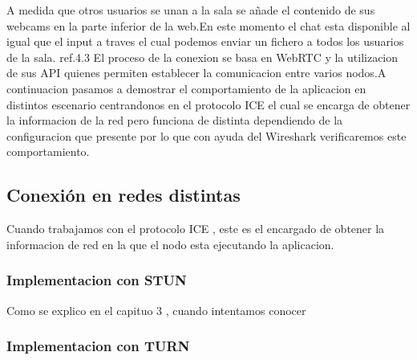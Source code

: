 A medida que otros usuarios se unan a la sala  se añade el contenido de sus webcams en la parte inferior de la web.En este momento el chat esta disponible al igual que el input a traves el cual podemos enviar un fichero a todos los usuarios de la sala. ref.4.3
El proceso de la conexion se basa en WebRTC y la utilizacion de sus API quienes permiten  establecer la comunicacion entre varios nodos.A continuacion pasamos a demostrar el comportamiento de la aplicacion en distintos escenario centrandonos en el protocolo ICE el cual se encarga de obtener la informacion de la red pero funciona de distinta dependiendo de la configuracion que presente por lo que con ayuda del Wireshark verificaremos este comportamiento.
\subsection{Conexión en redes distintas}
Cuando trabajamos con el protocolo ICE , este es el encargado de obtener la informacion de red en la que el nodo esta ejecutando la aplicacion.
\subsubsection{Implementacion con STUN}
Como se explico en el capituo 3 , cuando intentamos conocer

\subsubsection{Implementacion con TURN}
